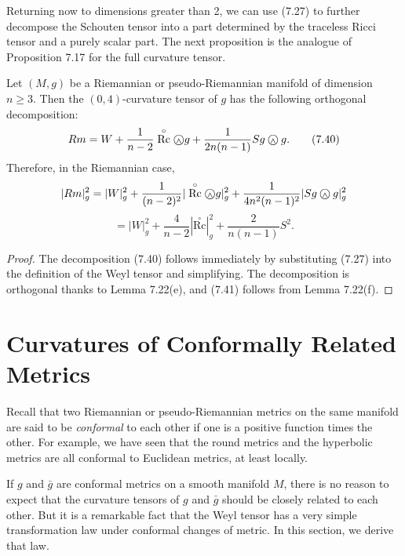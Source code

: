 Returning now to dimensions greater than 2, we can use (7.27) to further decompose the Schouten tensor into a part determined by the traceless Ricci tensor and a purely scalar part. The next proposition is the analogue of Proposition 7.17 for the full curvature tensor.

\begin{proposition}
\label{prop:ricci-decomposition}
Let $(M,g)$ be a Riemannian or pseudo-Riemannian manifold of dimension $n \geq 3$. Then the $(0,4)$-curvature tensor of $g$ has the following orthogonal decomposition:
\begin{equation}
Rm = W + \frac{1}{n-2}\stackrel{\circ}{\mathrm{Rc}} \owedge g + \frac{1}{2n(n-1)}S g \owedge g. \tag{7.40}
\end{equation}
Therefore, in the Riemannian case,
\[
|Rm|_g^2 = |W|_g^2 + \frac{1}{(n-2)^2}|\stackrel{\circ}{\mathrm{Rc}} \owedge g|_g^2 + \frac{1}{4n^2(n-1)^2}|S g \owedge g|_g^2
\]
\begin{equation}
= |W|_g^2 + \frac{4}{n-2}|\stackrel{\circ}{\mathrm{Rc}}|_g^2 + \frac{2}{n(n-1)}S^2. \tag{7.41}
\end{equation}
\end{proposition}

\begin{proof}
The decomposition (7.40) follows immediately by substituting (7.27) into the definition of the Weyl tensor and simplifying. The decomposition is orthogonal thanks to Lemma 7.22(e), and (7.41) follows from Lemma 7.22(f).
\end{proof}

\section{Curvatures of Conformally Related Metrics}

Recall that two Riemannian or pseudo-Riemannian metrics on the same manifold are said to be \emph{conformal} to each other if one is a positive function times the other. For example, we have seen that the round metrics and the hyperbolic metrics are all conformal to Euclidean metrics, at least locally.

If $g$ and $\bar{g}$ are conformal metrics on a smooth manifold $M$, there is no reason to expect that the curvature tensors of $g$ and $\bar{g}$ should be closely related to each other. But it is a remarkable fact that the Weyl tensor has a very simple transformation law under conformal changes of metric. In this section, we derive that law.

